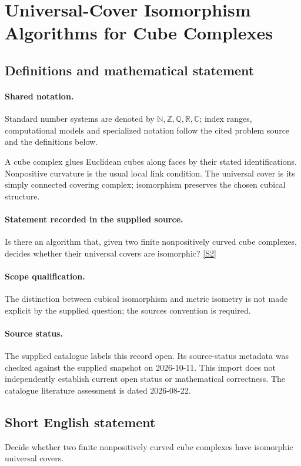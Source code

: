 \documentclass[11pt]{article}
\newcommand{\sref}[2]{\hyperlink{source:#1:#2}{[S#2]}}
\begin{document}
\section{Universal-Cover Isomorphism Algorithms for Cube Complexes}\label{statement}

\subsection{Definitions and mathematical statement}

\paragraph{Shared notation.}Standard number systems are denoted by $\mathbb N,\mathbb Z,\mathbb Q,\mathbb R,\mathbb C$; index ranges, computational models and specialized notation follow the cited problem source and the definitions below.


A cube complex glues Euclidean cubes along faces by their stated identifications. Nonpositive curvature is the usual local link condition. The universal cover is its simply connected covering complex; isomorphism preserves the chosen cubical structure.
\paragraph{Statement recorded in the supplied source.}
Is there an algorithm that, given two finite nonpositively curved cube complexes, decides whether their universal covers are isomorphic? \sref{statement}{2}
\paragraph{Scope qualification.}
The distinction between cubical isomorphism and metric isometry is not made explicit by the supplied question; the source\textquotesingle s convention is required.
\paragraph{Source status.}
The supplied catalogue labels this record open. Its source-status metadata was checked against the supplied snapshot on 2026-10-11. This import does not independently establish current open status or mathematical correctness. The catalogue literature assessment is dated 2026-08-22.
\subsection{Short English statement}
Decide whether two finite nonpositively curved cube complexes have isomorphic universal covers.
\end{document}
